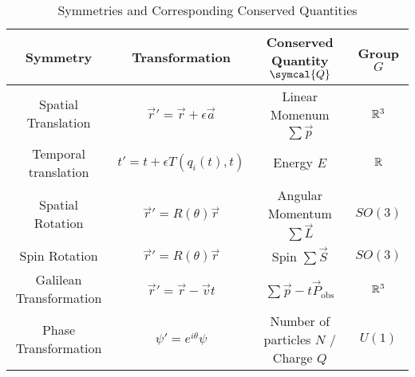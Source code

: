 \begin{table}[htbp]
  \centering
  \caption{Symmetries and Corresponding Conserved Quantities}
  \footnotesize
  \begin{tabular}{cccc}
    \toprule
    Symmetry                & Transformation                          & Conserved Quantity $\symcal{Q}$         & Group $G$ \\
    \midrule
    Spatial Translation     & $\vec{r}' = \vec{r} + \epsilon \vec{a}$ & Linear Momenum $\sum \vec{p}$           & $\mathbb{R}^3$ \\
    Temporal translation    & $t' = t + \epsilon T(q_i(t), t)$        & Energy $E$                              & $\mathbb{R}$   \\
    Spatial Rotation        & $\vec{r}' = R(\theta) \vec{r}$          & Angular Momentum $\sum \vec{L}$         & $SO(3)$   \\
    Spin Rotation           & $\vec{r}' = R(\theta) \vec{r}$          & Spin $\sum \vec{S}$                     & $SO(3)$   \\
    Galilean Transformation & $\vec{r}' = \vec{r} - \vec{v} t$        & $\sum \vec{p} - t \vec{P}_{\text{obs}}$ & $\mathbb{R}^3$ \\
    Phase Transformation    & $\psi' = e^{i \theta} \psi$             & Number of particles $N$ / Charge $Q$    & $U(1)$    \\
    \bottomrule
  \end{tabular}
  \label{tab:symmetries}
  \normalsize
\end{table}









\cite{hachiware-analyticalMechanics}
